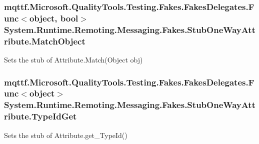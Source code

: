 \hypertarget{class_system_1_1_runtime_1_1_remoting_1_1_messaging_1_1_fakes_1_1_stub_one_way_attribute_afc1da70395e8969e7176dffaaa19a8f3}{
\subsubsection[{Match\-Object}]{\setlength{\rightskip}{0pt plus 5cm}mqttf.\-Microsoft.\-Quality\-Tools.\-Testing.\-Fakes.\-Fakes\-Delegates.\-Func$<$object, bool$>$ System.\-Runtime.\-Remoting.\-Messaging.\-Fakes.\-Stub\-One\-Way\-Attribute.\-Match\-Object}}\label{class_system_1_1_runtime_1_1_remoting_1_1_messaging_1_1_fakes_1_1_stub_one_way_attribute_afc1da70395e8969e7176dffaaa19a8f3}


Sets the stub of Attribute.\-Match(\-Object obj)

\hypertarget{class_system_1_1_runtime_1_1_remoting_1_1_messaging_1_1_fakes_1_1_stub_one_way_attribute_aa55bc6f6fe2ef41740a7f8dafefa8806}{
\subsubsection[{Type\-Id\-Get}]{\setlength{\rightskip}{0pt plus 5cm}mqttf.\-Microsoft.\-Quality\-Tools.\-Testing.\-Fakes.\-Fakes\-Delegates.\-Func$<$object$>$ System.\-Runtime.\-Remoting.\-Messaging.\-Fakes.\-Stub\-One\-Way\-Attribute.\-Type\-Id\-Get}}\label{class_system_1_1_runtime_1_1_remoting_1_1_messaging_1_1_fakes_1_1_stub_one_way_attribute_aa55bc6f6fe2ef41740a7f8dafefa8806}


Sets the stub of Attribute.\-get\-\_\-\-Type\-Id()



